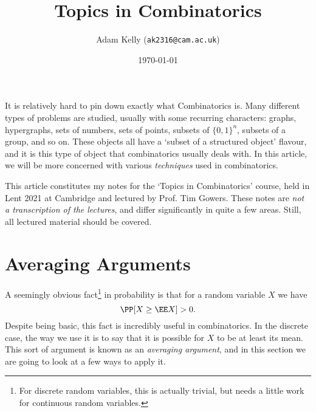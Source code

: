 \documentclass[a4paper]{scrartcl}
\title{Topics in Combinatorics}
\author{Adam Kelly (\texttt{ak2316@cam.ac.uk})}
\date{\today}
\begin{document}
\maketitle

It is relatively hard to pin down exactly what Combinatorics is. Many different types of problems are studied, usually with some recurring characters: graphs, hypergraphs, sets of numbers, sets of points, subsets of $\{0, 1\}^n$, subsets of a group, and so on. These objects all have a `subset of a structured object' flavour, and it is this type of object that combinatorics usually deals with. In this article, we will be more concerned with various \emph{techniques} used in combinatorics.

This article constitutes my notes for the `Topics in Combinatorics' course, held in Lent 2021 at Cambridge and lectured by Prof. Tim Gowers. These notes are \emph{not a transcription of the lectures}, and differ significantly in quite a few areas. Still, all lectured material should be covered.


\tableofcontents





\section{Averaging Arguments}

A seemingly obvious fact\footnote{For discrete random variables, this is actually trivial, but needs a little work for continuous random variables.} in probability is that for a random variable $X$ we have
$$
\PP[X \geq \EE X] > 0.
$$
Despite being basic, this fact is incredibly useful in combinatorics. In the discrete case, the way we use it is to say that it is possible for $X$ to be at least its mean. This sort of argument is known as an \emph{averaging argument}, and in this section we are going to look at a few ways to apply it.
\end{document}
